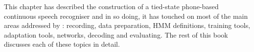 This chapter has described the construction of a tied-state phone-based
continuous speech recogniser and in so doing, it has touched on most of the
main areas addressed by \HTK: recording, data preparation, HMM definitions,
training tools, adaptation tools, networks, decoding and evaluating.  The rest of this book
discusses each of these topics in detail.



